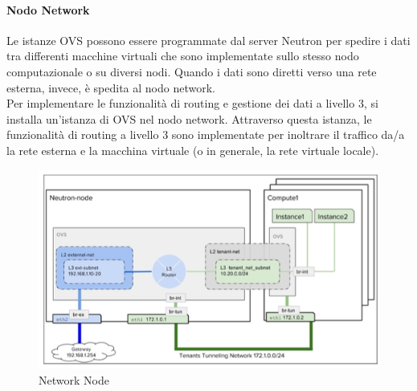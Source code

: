 \documentclass{article}
\begin{document}
\paragraph{Nodo Network}
Le istanze OVS possono essere programmate dal server Neutron per spedire i dati tra differenti macchine virtuali che sono implementate sullo stesso nodo computazionale o su diversi nodi. Quando i dati sono diretti verso una rete esterna, invece, è spedita al nodo network. \\ 
Per implementare le funzionalità di routing e gestione dei dati a livello 3, si installa un'istanza di OVS nel nodo network. Attraverso questa istanza, le funzionalità di routing a livello 3 sono implementate per inoltrare il traffico da/a la rete esterna e la macchina virtuale (o in generale, la rete virtuale locale).
\begin{figure}[H]
    \centering
    \includegraphics[scale=0.5]{img/network node architecture.png}
    \caption{Network Node}
\end{figure}\noindent
\end{document}
